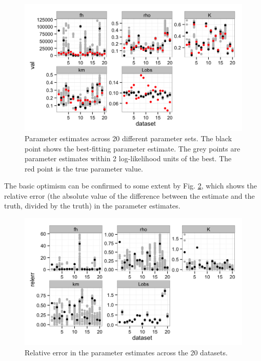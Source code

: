 \documentclass[12pt,reqno,final,pdftex]{amsart}\usepackage[]{graphicx}\usepackage[]{color}
\newenvironment{knitrout}{}{} %
\theoremstyle{plain}
\numberwithin{equation}{part}
\begin{document}
\begin{knitrout}\scriptsize
{}\color{fgcolor}\begin{figure}

\includegraphics[width=\linewidth]{figure/mult-datasets-fitting-1} \hfill{}

\caption[Parameter estimates across 20 different parameter sets]{Parameter estimates across 20 different parameter sets. The black point shows the best-fitting parameter estimate. The grey points are parameter estimates within 2 log-likelihood units of the best. The red point is the true parameter value.}\label{fig:mult-datasets-fitting}
\end{figure}


\end{knitrout}

The basic optimism can be confirmed to some extent by Fig. \ref{fig:mult-datasets-relerr}, which shows the relative error (the absolute value of the difference between the estimate and the truth, divided by the truth) in the parameter estimates.

\begin{knitrout}\scriptsize
{}\color{fgcolor}\begin{figure}

\includegraphics[width=\linewidth]{figure/mult-datasets-relerr-1} \hfill{}

\caption[Relative error in the parameter estimates across the 20 datasets]{Relative error in the parameter estimates across the 20 datasets.}\label{fig:mult-datasets-relerr}
\end{figure}


\end{knitrout}
\end{document}
